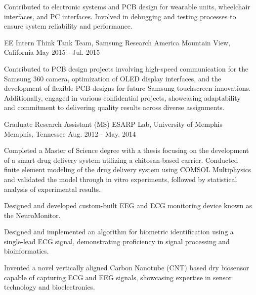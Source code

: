 \begin{cventries}
{\begin{cvitems}
        \item {Contributed to electronic systems and PCB design for wearable units, wheelchair interfaces, and PC interfaces. Involved in debugging and testing processes to ensure system reliability and performance.} 
      \end{cvitems}
    }
  \cventry
    {EE Intern}
    {Think Tank Team, Samsung Research America}
    {Mountain View, California}
    {May 2015 - Jul. 2015}
    {
      \begin{cvitems}
        \item {Contributed to PCB design projects involving high-speed communication for the Samsung 360 camera, optimization of OLED display interfaces, and the development of flexible PCB designs for future Samsung touchscreen innovations. Additionally, engaged in various confidential projects, showcasing adaptability and commitment to delivering quality results across diverse assignments.}
      \end{cvitems}
    }
  \cventry
    {Graduate Research Assistant (MS)}
    {ESARP Lab, University of Memphis}
    {Memphis, Tennessee}
    {Aug. 2012 - May. 2014}
    {
      \begin{cvitems}
        \item {Completed a Master of Science degree with a thesis focusing on the development of a smart drug delivery system utilizing a chitosan-based carrier. Conducted finite element modeling of the drug delivery system using COMSOL Multiphysics and validated the model through in vitro experiments, followed by statistical analysis of experimental results.}
        \item{Designed and developed custom-built EEG and ECG monitoring device known as the NeuroMonitor.}
        \item{Designed and implemented an algorithm for biometric identification using a single-lead ECG signal, demonstrating proficiency in signal processing and bioinformatics.}
        \item{Invented a novel vertically aligned Carbon Nanotube (CNT) based dry biosensor capable of capturing ECG and EEG signals, showcasing expertise in sensor technology and bioelectronics.}
      \end{cvitems} 
    }
\end{cventries}

